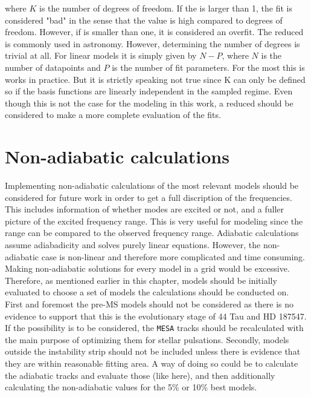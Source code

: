 \noindent where $K$ is the number of degrees of freedom. If the \chis is larger than 1, the fit is considered "bad" in the sense that the value is high compared to degrees of freedom. However, if \chis is smaller than one, it is considered an overfit. The reduced \chis is commonly used in astronomy. However, determining the number of degrees is trivial at all. For linear models it is simply given by $N-P$, where $N$ is the number of datapoints and $P$ is the number of fit parameters. For the most this is works in practice. But it is strictly speaking not true  since K can only be defined so if the basis functions are linearly independent in the sampled regime. Even though this is not the case for the modeling in this work, a reduced \chis should be considered to make a more complete evaluation of the \chis fits. 

\section{Non-adiabatic calculations}

Implementing non-adiabatic calculations of the most relevant models should be considered for future work in order to get a full discription of the frequencies. This includes information of whether modes are excited or not, and a fuller picture of the excited frequency range. This is very useful for modeling since the range can be compared to the observed frequency range. Adiabatic calculations assume adiabadicity and solves purely linear equations. However, the non-adiabatic case is non-linear and therefore more complicated and time consuming. Making non-adiabatic solutions for every model in a grid would be excessive. Therefore, as mentioned earlier in this chapter, models should be initially evaluated to choose a set of models the calculations should be conducted on. First and foremost the pre-MS models should not be considered as there is no evidence to support that this is the evolutionary stage of 44 Tau and HD 187547. If the possibility is to be considered, the \texttt{MESA} tracks should be recalculated with the main purpose of optimizing them for stellar pulsations.  Secondly, models outside the instability strip should not be included unless there is evidence that they are within reasonable fitting area. A way of doing so could be to calculate the adiabatic tracks and evaluate those (like here), and then additionally calculating the non-adiabatic values for the 5\% or 10\% best models. 

